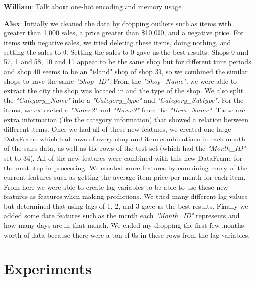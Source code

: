 \documentclass{article}
\begin{document}
\textbf{William}:\newline
Talk about one-hot encoding and memory usage

\textbf{Alex}:\newline
Initially we cleaned the data by dropping outliers such as items with greater than 1,000 sales, a price greater than \$10,000, and a negative price. For items with negative sales, we tried deleting these items, doing nothing, and setting the sales to 0. Setting the sales to 0 gave us the best results. Shops 0 and 57, 1 and 58, 10 and 11 appear to be the same shop but for different time periods and shop 40 seems to be an "island" shop of shop 39, so we combined the similar shops to have the same \textit{"Shop\_ID"}.\newline
From the \textit{"Shop\_Name"}, we were able to extract the city the shop was located in and the type of the shop. We also split the \textit{"Category\_Name"} into a \textit{"Category\_type"} and \textit{"Category\_Subtype"}. For the items, we extracted a \textit{"Name2"} and \textit{"Name3"} from the \textit{"Item\_Name"}. These are extra information (like the category information) that showed a relation between different items. Once we had all of these new features, we created one large DataFrame which had rows of every shop and item combinations in each month of the sales data, as well as the rows of the test set (which had the \textit{"Month\_ID"} set to 34). All of the new features were combined with this new DataFrame for the next step in processing.\newline
We created more features by combining many of the current features such as getting the average item price per month for each item. From here we were able to create lag variables to be able to use these new features as features when making predictions. We tried many different lag values but determined that using lags of 1, 2, and 3 gave us the best results. Finally we added some date features such as the month each \textit{"Month\_ID"} represents and how many days are in that month. We ended my dropping the first few months worth of data because there were a ton of 0s in these rows from the lag variables.


\section{Experiments}
\end{document}
